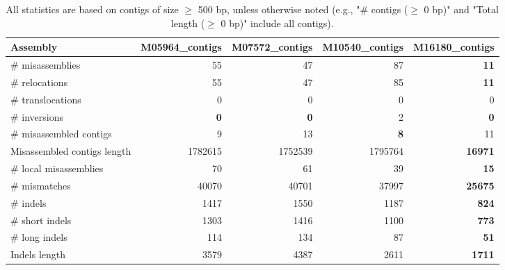 \documentclass[12pt,a4paper]{article}
\begin{document}
\begin{table}[ht]
\begin{center}
\caption{All statistics are based on contigs of size $\geq$ 500 bp, unless otherwise noted (e.g., "\# contigs ($\geq$ 0 bp)" and "Total length ($\geq$ 0 bp)" include all contigs).}
\begin{tabular}{|l*{4}{|r}|}
\hline
Assembly & M05964\_contigs & M07572\_contigs & M10540\_contigs & M16180\_contigs \\ \hline
\# misassemblies & 55 & 47 & 87 & {\bf 11} \\ \hline
\hspace{5mm}\# relocations & 55 & 47 & 85 & {\bf 11} \\ \hline
\hspace{5mm}\# translocations & 0 & 0 & 0 & 0 \\ \hline
\hspace{5mm}\# inversions & {\bf 0} & {\bf 0} & 2 & {\bf 0} \\ \hline
\# misassembled contigs & 9 & 13 & {\bf 8} & 11 \\ \hline
Misassembled contigs length & 1782615 & 1752539 & 1795764 & {\bf 16971} \\ \hline
\# local misassemblies & 70 & 61 & 39 & {\bf 15} \\ \hline
\# mismatches & 40070 & 40701 & 37997 & {\bf 25675} \\ \hline
\# indels & 1417 & 1550 & 1187 & {\bf 824} \\ \hline
\hspace{5mm}\# short indels & 1303 & 1416 & 1100 & {\bf 773} \\ \hline
\hspace{5mm}\# long indels & 114 & 134 & 87 & {\bf 51} \\ \hline
Indels length & 3579 & 4387 & 2611 & {\bf 1711} \\ \hline
\end{tabular}
\end{center}
\end{table}
\end{document}
